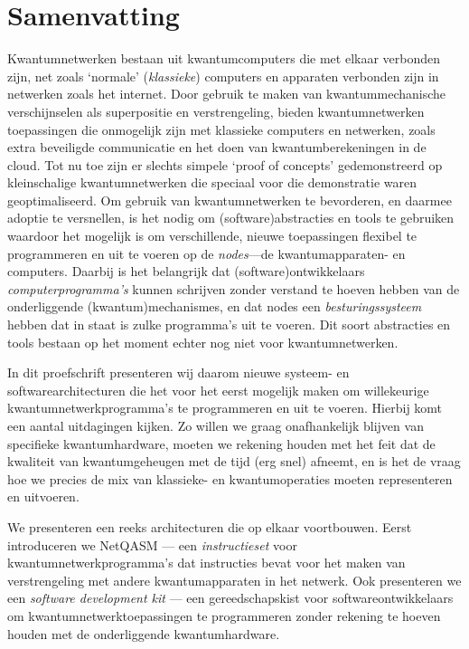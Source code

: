 \chapter*{Samenvatting}

{

Kwantumnetwerken bestaan uit kwantumcomputers die met elkaar verbonden zijn, net zoals `normale' (\emph{klassieke}) computers en apparaten verbonden zijn in netwerken zoals het internet.
Door gebruik te maken van kwantummechanische verschijnselen als superpositie en verstrengeling, bieden kwantumnetwerken toepassingen die onmogelijk zijn met klassieke computers en netwerken, zoals extra beveiligde communicatie en het doen van kwantumberekeningen in de cloud.
Tot nu toe zijn er slechts simpele `proof of concepts' gedemonstreerd op kleinschalige kwantumnetwerken die speciaal voor die demonstratie waren geoptimaliseerd.
Om gebruik van kwantumnetwerken te bevorderen, en daarmee adoptie te versnellen, is het nodig om (software)abstracties en tools te gebruiken waardoor het mogelijk is om verschillende, nieuwe toepassingen flexibel te programmeren en uit te voeren op de \emph{nodes}---de kwantumapparaten- en computers.
Daarbij is het belangrijk dat (software)ontwikkelaars \emph{computerprogramma's} kunnen schrijven zonder verstand te hoeven hebben van de onderliggende (kwantum)mechanismes, en dat nodes een \emph{besturingssysteem} hebben dat in staat is zulke programma's uit te voeren.
Dit soort abstracties en tools bestaan op het moment echter nog niet voor kwantumnetwerken.

In dit proefschrift presenteren wij daarom nieuwe systeem- en softwarearchitecturen die het voor het eerst mogelijk maken om willekeurige kwantumnetwerkprogramma's te programmeren en uit te voeren.
Hierbij komt een aantal uitdagingen kijken.
Zo willen we graag onafhankelijk blijven van specifieke kwantumhardware, moeten we rekening houden met het feit dat de kwaliteit van kwantumgeheugen met de tijd (erg snel) afneemt, en is het de vraag hoe we precies de mix van klassieke- en kwantumoperaties moeten representeren en uitvoeren.

We presenteren een reeks architecturen die op elkaar voortbouwen.
Eerst introduceren we NetQASM --- een \emph{instructieset} voor kwantumnetwerkprogramma's dat instructies bevat voor het maken van verstrengeling met andere kwantumapparaten in het netwerk.
Ook presenteren we een \emph{software development kit} --- een gereedschapskist voor softwareontwikkelaars om kwantumnetwerktoepassingen te programmeren zonder rekening te hoeven houden met de onderliggende kwantumhardware.

}
